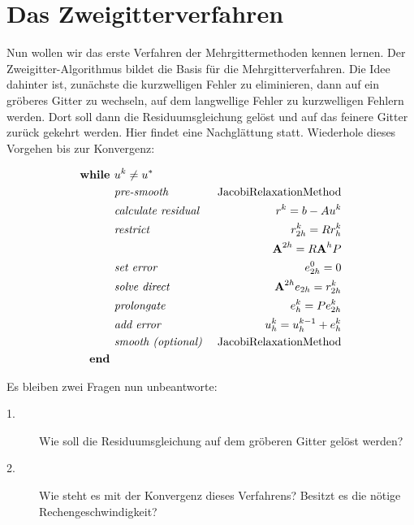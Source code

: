 \section{Das Zweigitterverfahren}\label{s.Der Zweigitter-Algorithmus}

Nun wollen wir das erste Verfahren der Mehrgittermethoden kennen lernen. Der Zweigitter-Algorithmus bildet die Basis für die Mehrgitterverfahren. Die Idee dahinter ist, zunächste die kurzwelligen Fehler zu eliminieren, dann auf ein gröberes Gitter zu wechseln, auf dem langwellige Fehler zu kurzwelligen Fehlern werden. Dort soll dann die Residuumsgleichung gelöst und auf das feinere Gitter zurück gekehrt werden. Hier findet eine Nachglättung statt. Wiederhole dieses Vorgehen bis zur Konvergenz:

\begin{eqnarray}
\textbf{while }                                 &u^{k} \ne u^{*} \notag \\
&\textit{pre-smooth }                         &\textnormal{JacobiRelaxationMethod} \notag \\
&\textit{calculate residual }        &r^{k} = b - Au^{k} \notag \\
&\textit{restrict }                         &r^{k}_{2h}=Rr^{k}_{h} \notag \\
&                                                                &{\textbf{A}}^{2h} = R{\textbf{A}}^{h}P \notag \\
&\textit{set error }                        &e^{0}_{2h} = 0 \notag \\
&\textit{solve direct }                        &{\textbf{A}}^{2h} e_{2h} = r^{k}_{2h} \notag \\
&\textit{prolongate }                        &e^{k}_{h} = Pe^{k}_{2h} \notag \\
&\textit{add error }                        &u^{k}_{h} = u^{k-1}_{h} + e^{k}_{h} \notag \\
&\textit{smooth (optional) }        &\textnormal{JacobiRelaxationMethod} \notag \\
\textbf{end } \notag
\end{eqnarray}

Es bleiben zwei Fragen nun unbeantworte:
\begin{description}
\item[1.] Wie soll die Residuumsgleichung auf dem gröberen Gitter gelöst werden?
\item[2.] Wie steht es mit der Konvergenz dieses Verfahrens? Besitzt es die nötige Rechengeschwindigkeit?
\end{description}

